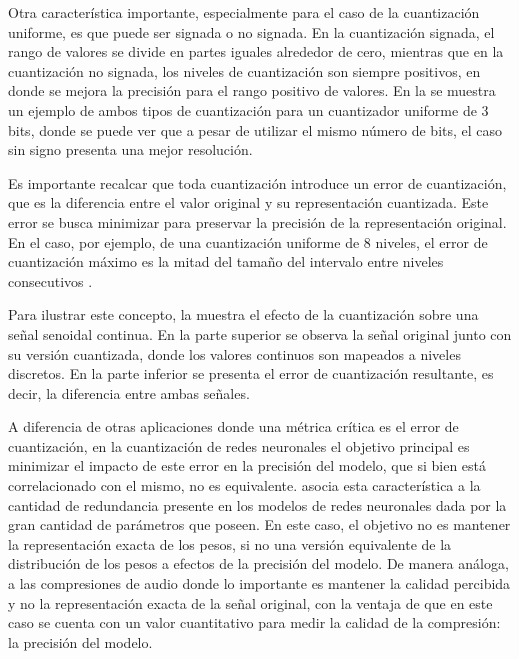 Otra característica importante, especialmente para el caso de la cuantización uniforme, es que puede ser signada o no signada. En la cuantización signada, el rango de valores se divide en partes iguales alrededor de cero, mientras que en la cuantización no signada, los niveles de cuantización son siempre positivos, en donde se mejora la precisión para el rango positivo de valores. En la  se muestra un ejemplo de ambos tipos de cuantización para un cuantizador uniforme de 3 bits, donde se puede ver que a pesar de utilizar el mismo número de bits, el caso sin signo presenta una mejor resolución.


Es importante recalcar que toda cuantización introduce un error de cuantización, que es la diferencia entre el valor original y su representación cuantizada. Este error se busca minimizar para preservar la precisión de la representación original. En el caso, por ejemplo, de una cuantización uniforme de 8 niveles, el error de cuantización máximo es la mitad del tamaño del intervalo entre niveles consecutivos \cite{sayood2017introduction}.

Para ilustrar este concepto, la  muestra el efecto de la cuantización sobre una señal senoidal continua. En la parte superior se observa la señal original junto con su versión cuantizada, donde los valores continuos son mapeados a niveles discretos. En la parte inferior se presenta el error de cuantización resultante, es decir, la diferencia entre ambas señales.


A diferencia de otras aplicaciones donde una métrica crítica es el error de cuantización, en la cuantización de redes neuronales el objetivo principal es minimizar el impacto de este error en la precisión del modelo, que si bien está correlacionado con el mismo, no es equivalente. \cite{gholami2021surveyquantizationmethodsefficient} asocia esta característica a la cantidad de redundancia presente en los modelos de redes neuronales dada por la gran cantidad de parámetros que poseen. En este caso, el objetivo no es mantener la representación exacta de los pesos, si no una versión equivalente de la distribución de los pesos a efectos de la precisión del modelo. De manera análoga, a las compresiones de audio donde lo importante es mantener la calidad percibida y no la representación exacta de la señal original, con la ventaja de que en este caso se cuenta con un valor cuantitativo para medir la calidad de la compresión: la precisión del modelo.

